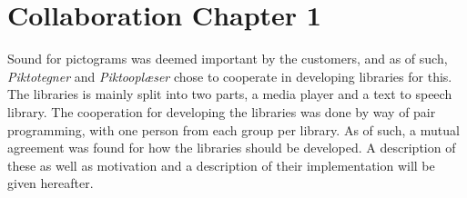 \chapter{Collaboration Chapter 1}
Sound for pictograms was deemed important by the customers, and as of such, \textit{Piktotegner} and \textit{Piktooplæser} chose to cooperate in developing libraries for this.
The libraries is mainly split into two parts, a media player and a text to speech library.
The cooperation for developing the libraries was done by way of pair programming, with one person from each group per library.
As of such, a mutual agreement was found for how the libraries should be developed.
A description of these as well as motivation and a description of their implementation will be given hereafter.





